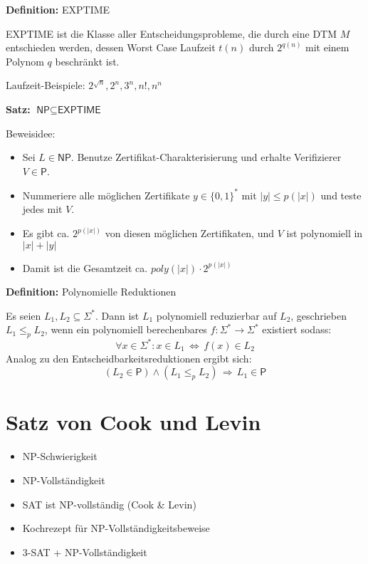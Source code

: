 \documentclass[a4paper,graphics,11pt]{article}
\newcommand{\Iff}[0]{\,\Longleftrightarrow\,}
\begin{document}
\strut

\textbf{Definition:} \textsf{EXPTIME}

\textsf{EXPTIME} ist die Klasse aller Entscheidungsprobleme,
die durch eine DTM $M$ entschieden werden, dessen Worst Case Laufzeit $t(n)$
durch $2^{q(n)}$ mit einem Polynom $q$ beschränkt ist.

Laufzeit-Beispiele: $2^{\sqrt{n}}, 2^n, 3^n, n!, n^n$

\newpage

\textbf{Satz:} $\textsf{NP} \subseteq \textsf{EXPTIME}$

Beweisidee:
\begin{itemize}
    \item Sei $L \in \textsf{NP}$. Benutze Zertifikat-Charakterisierung und erhalte Verifizierer $V \in \textsf{P}$.
    \item Nummeriere alle möglichen Zertifikate $y \in \{0,1\}^*$  mit $|y| \leq p(|x|)$ und teste jedes mit $V$.
    \item Es gibt ca. $2^{p(|x|)}$ von diesen möglichen Zertifikaten,
        und $V$ ist polynomiell in $|x| + |y|$
    \item Damit ist die Gesamtzeit ca. $poly(|x|)\cdot 2^{p(|x|)}$
\end{itemize}

\strut

\textbf{Definition:} Polynomielle Reduktionen

Es seien $L_1,L_2 \subseteq \Sigma^*$. Dann ist $L_1$ polynomiell reduzierbar auf $L_2$, geschrieben $L_1 \leq_p L_2$,
wenn ein polynomiell berechenbares $f : \Sigma^* \to \Sigma^*$ existiert sodass:
$$
    \forall x \in \Sigma^* : x \in L_1 \Iff f(x) \in L_2
$$
Analog zu den Entscheidbarkeitsreduktionen ergibt sich:
$$
    (L_2 \in \textsf{P}) \land (L_1 \leq_p L_2) \,\Longrightarrow\, L_1 \in \textsf{P}
$$

\newpage

\section{Satz von Cook und Levin}

\begin{itemize}
    \item \textsf{NP}-Schwierigkeit
    \item \textsf{NP}-Vollständigkeit
    \item SAT ist \textsf{NP}-vollständig (Cook \& Levin)
    \item Kochrezept für \textsf{NP}-Vollständigkeitsbeweise
    \item 3-SAT + \textsf{NP}-Vollständigkeit
\end{itemize}
\end{document}
